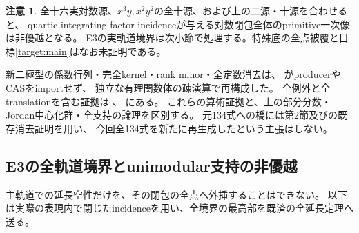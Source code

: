 \documentclass[a4paper,11pt]{ltjsarticle}
\theoremstyle{definition}
\newtheorem{remark}[proposition]{注意}
\begin{document}
\begin{remark}
全十六実対数源、$x^3y,x^2y^2$の全十源、および上の二源・十源を合わせると、
quartic integrating-factor incidenceが与える対数閉包全体のprimitive一次像は非優越となる。
E3の実軌道境界は次小節で処理する。特殊底の全点被覆と目標\ref{target:main}はなお未証明である。
\end{remark}

新二極型の係数行列・完全kernel・rank minor・全定数消去は、
がproducerやCASをimportせず、
独立な有理関数体の疎演算で再構成した。
全例外と全translationを含む証拠は
、
にある。
これらの算術証拠と、上の部分分数・Jordan中心化群・全支持の論理を区別する。
元134式への橋には第2節及びの既存消去証明を用い、
今回全134式を新たに再生成したという主張はしない。

\subsection{E3の全軌道境界とunimodular支持の非優越}
主軌道での延長空性だけを、その閉包の全点へ外挿することはできない。
以下は実際の表現内で閉じたincidenceを用い、全境界の最高部を既済の全延長定理へ送る。
\end{document}
